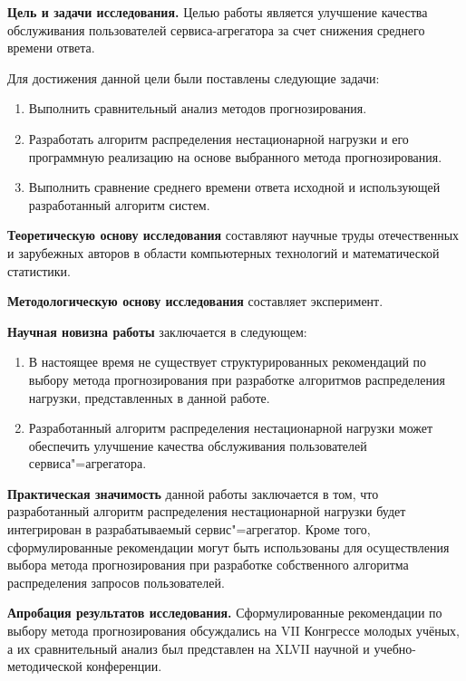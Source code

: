 \documentclass[a4paper,14pt,russian]{extreport}
\begin{document}
{\bfseries Цель и задачи исследования.}  Целью работы является улучшение 
качества обслуживания пользователей сервиса-агрегатора за счет снижения 
среднего времени ответа.

Для достижения данной цели были поставлены следующие задачи:
\begin{enumerate}
	\item Выполнить сравнительный анализ методов прогнозирования.
	\item Разработать алгоритм распределения нестационарной нагрузки и его 
		программную реализацию на основе выбранного метода 
		прогнозирования.
	\item Выполнить сравнение среднего времени ответа исходной и 
		использующей разработанный алгоритм систем.
\end{enumerate}

{\bfseries Теоретическую основу исследования} составляют научные труды
отечественных и зарубежных авторов в области компьютерных технологий и
математической статистики.

{\bfseries Методологическую основу исследования} составляет эксперимент.

{\bfseries Научная новизна работы} заключается в следующем:
\begin{enumerate}
	\item В настоящее время не существует структурированных рекомендаций 
		по выбору метода прогнозирования при разработке алгоритмов 
		распределения нагрузки, представленных в данной работе. 
	\item Разработанный алгоритм распределения нестационарной нагрузки 
		может обеспечить улучшение качества обслуживания пользователей
		сервиса"=агрегатора.
\end{enumerate}

{\bfseries Практическая значимость} данной работы заключается в том, что 
разработанный алгоритм распределения нестационарной нагрузки будет
интегрирован в разрабатываемый сервис"=агрегатор. Кроме того, 
сформулированные рекомендации могут быть использованы для осуществления 
выбора метода прогнозирования при разработке собственного алгоритма 
распределения запросов пользователей.

{\bfseries Апробация результатов исследования.} Сформулированные 
рекомендации по выбору метода прогнозирования обсуждались на VII Конгрессе 
молодых учёных, а их сравнительный анализ был представлен на XLVII научной 
и учебно-методической конференции.
\end{document}
